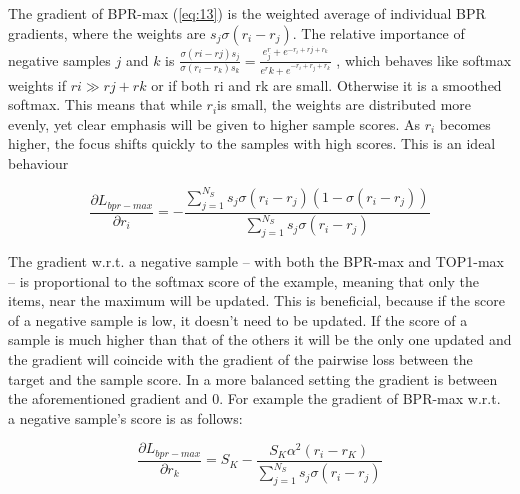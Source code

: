 \documentclass{article} %
\begin{document}
The gradient of BPR-max (\ref{eq:13}) is the weighted average of individual BPR gradients, where the
weights are $s_j \sigma (r_i − r_j)$. The relative importance of negative samples $j$ and $k$ is 
$\frac{\sigma(ri−rj )s_j} {\sigma(r_i−r_k)s_k} = \frac{e^r_j + e^{-r_i+rj+r_k}}{e^rk + e^{-r_i+r_j+r_k}} $
, which behaves like softmax weights if $ri \gg rj + rk$ or if both ri and rk are small.
Otherwise it is a smoothed softmax. This means that while $r_i$is small, the weights are distributed
more evenly, yet clear emphasis will be given to higher sample scores. As $r_i$ becomes higher, the
focus shifts quickly to the samples with high scores. This is an ideal behaviour

\begin{equation}\label{eq:13}
  \frac{\partial L_{bpr-max}} {\partial r_i} = - \frac{\sum_{j=1}^{N_S} s_j \sigma(r_i - r_j)(1-\sigma (r_i - r_j))} {\sum_{j=1}^{N_S} s_j \sigma (r_i - r_j)}
\end{equation}

The gradient w.r.t. a negative sample – with both the BPR-max and TOP1-max – is proportional to the softmax score of the example, meaning that only the items, near the maximum will be updated. This is beneficial, because if the score of a negative sample is low, it doesn’t need to be updated. If the score of a sample is much higher than that of the others it will be the only one updated and the gradient will coincide with the gradient of the pairwise loss between the target and the sample score. In a more balanced setting the gradient is between the aforementioned gradient and 0. For example the gradient of BPR-max w.r.t. a negative sample’s score is as follows:


\begin{equation}\label{eq:14}
  \frac{\partial L_{bpr-max}} {\partial r_k} = S_K - \frac{S_K \alpha^2 (r_i - r_K)} {\sum_{j=1}^{N_S} s_j \sigma (r_i - r_j)}
\end{equation}
\end{document}
